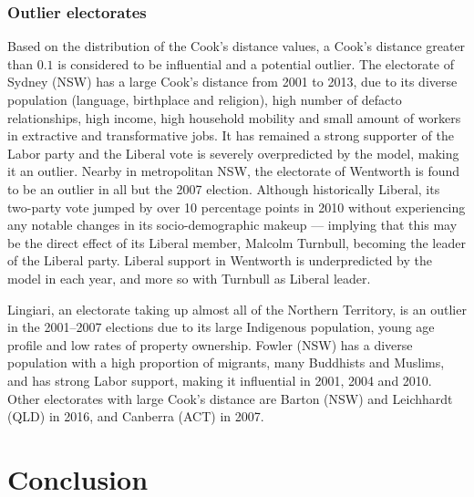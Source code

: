 \documentclass[times, doublespace]{anzsauth}
\begin{document}
\hypertarget{outlier-electorates}{%
\subsubsection*{Outlier electorates}\label{outlier-electorates}}

Based on the distribution of the Cook's distance values, a Cook's distance greater than \(0.1\) is considered to be influential and a potential outlier. The electorate of Sydney (NSW) has a large Cook's distance from 2001 to 2013, due to its diverse population (language, birthplace and religion), high number of defacto relationships, high income, high household mobility and small amount of workers in extractive and transformative jobs. It has remained a strong supporter of the Labor party and the Liberal vote is severely overpredicted by the model, making it an outlier. Nearby in metropolitan NSW, the electorate of Wentworth is found to be an outlier in all but the 2007 election. Although historically Liberal, its two-party vote jumped by over 10 percentage points in 2010 without experiencing any notable changes in its socio-demographic makeup --- implying that this may be the direct effect of its Liberal member, Malcolm Turnbull, becoming the leader of the Liberal party. Liberal support in Wentworth is underpredicted by the model in each year, and more so with Turnbull as Liberal leader.

Lingiari, an electorate taking up almost all of the Northern Territory, is an outlier in the 2001--2007 elections due to its large Indigenous population, young age profile and low rates of property ownership. Fowler (NSW) has a diverse population with a high proportion of migrants, many Buddhists and Muslims, and has strong Labor support, making it influential in 2001, 2004 and 2010. Other electorates with large Cook's distance are Barton (NSW) and Leichhardt (QLD) in 2016, and Canberra (ACT) in 2007.

\hypertarget{conclusion}{%
\section{Conclusion}\label{conclusion}}
\end{document}

